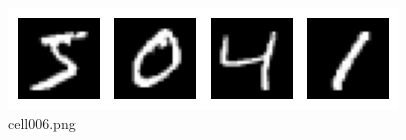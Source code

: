 \begin{figure}[ht]
	\centering
	\includegraphics[scale=0.8, max width=\linewidth]{./fig/energy-based-model/boltzmann-machine/cell006.png}
	\caption{cell006.png}
	\label{cell006.png}
\end{figure}